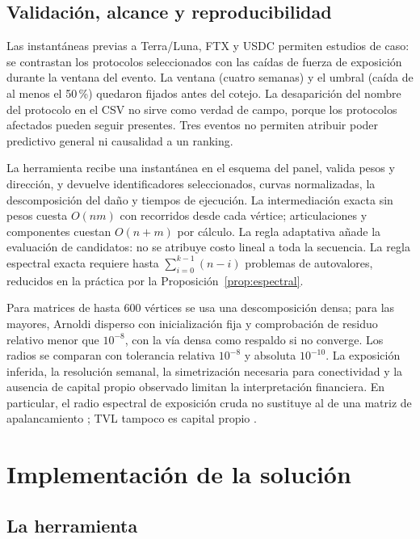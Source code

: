\documentclass[journal]{IEEEtran}
\begin{document}
\subsection{Validación, alcance y reproducibilidad}

Las instantáneas previas a Terra/Luna, FTX y USDC permiten estudios de caso:
se contrastan los protocolos seleccionados con las caídas de fuerza de
exposición durante la ventana del evento. La ventana (cuatro semanas) y el
umbral (caída de al menos el 50\,\%) quedaron fijados antes del cotejo. La
desaparición del nombre del protocolo en el CSV no sirve como verdad de campo,
porque los protocolos afectados pueden seguir presentes. Tres eventos no
permiten atribuir poder predictivo general ni causalidad a un ranking.

La herramienta recibe una instantánea en el esquema del panel, valida pesos y
dirección, y devuelve identificadores seleccionados, curvas normalizadas, la
descomposición del daño y tiempos de ejecución. La
intermediación exacta sin pesos cuesta $O(nm)$ con recorridos desde cada vértice;
articulaciones y componentes cuestan $O(n+m)$ por cálculo. La regla adaptativa
añade la evaluación de candidatos: no se atribuye costo lineal a toda la
secuencia. La regla espectral exacta requiere hasta $\sum_{i=0}^{k-1}(n-i)$
problemas de autovalores, reducidos en la práctica por la
Proposición~\ref{prop:espectral}.

Para matrices de hasta 600 vértices se usa una descomposición densa; para las
mayores, Arnoldi disperso con inicialización fija y comprobación de residuo
relativo menor que $10^{-8}$, con la vía densa como respaldo si no converge.
Los radios se comparan con tolerancia relativa $10^{-8}$ y absoluta
$10^{-10}$. La exposición inferida, la resolución
semanal, la simetrización necesaria para conectividad y la ausencia de capital
propio observado limitan la interpretación financiera. En particular, el
radio espectral de exposición cruda no sustituye al de una matriz de
apalancamiento \cite{macchiati2024spectral}; TVL tampoco es capital propio
\cite{luo2024piercing}.

\section{Implementación de la solución}
\label{sec:implementacion}

\subsection{La herramienta}
\end{document}
